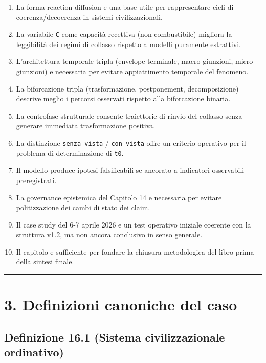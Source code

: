\begin{enumerate}
\def\labelenumi{\arabic{enumi}.}
\tightlist
\item
  La forma reaction-diffusion e una base utile per rappresentare cicli di coerenza/decoerenza in sistemi civilizzazionali.
\item
  La variabile \texttt{C} come capacità recettiva (non combustibile) migliora la leggibilità dei regimi di collasso rispetto a modelli puramente estrattivi.
\item
  L'architettura temporale tripla (envelope terminale, macro-giunzioni, micro-giunzioni) e necessaria per evitare appiattimento temporale del fenomeno.
\item
  La biforcazione tripla (trasformazione, postponement, decomposizione) descrive meglio i percorsi osservati rispetto alla biforcazione binaria.
\item
  La controfase strutturale consente traiettorie di rinvio del collasso senza generare immediata trasformazione positiva.
\item
  La distinzione \texttt{senza\ vista} / \texttt{con\ vista} offre un criterio operativo per il problema di determinazione di \texttt{t0}.
\item
  Il modello produce ipotesi falsificabili se ancorato a indicatori osservabili preregistrati.
\item
  La governance epistemica del Capitolo 14 e necessaria per evitare politizzazione dei cambi di stato dei claim.
\item
  Il case study del 6-7 aprile 2026 e un test operativo iniziale coerente con la struttura v1.2, ma non ancora conclusivo in senso generale.
\item
  Il capitolo e sufficiente per fondare la chiusura metodologica del libro prima della sintesi finale.
\end{enumerate}

\begin{center}\rule{0.5\linewidth}{0.5pt}\end{center}

\section{3. Definizioni canoniche del caso}

\subsection{Definizione 16.1 (Sistema civilizzazionale ordinativo)}

